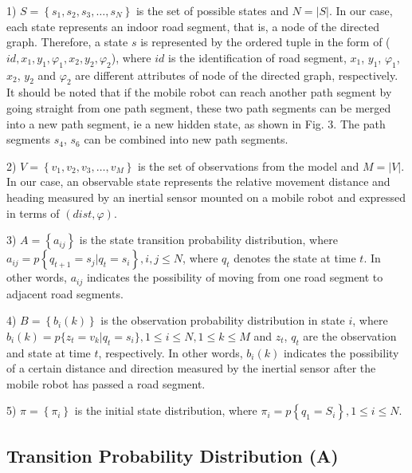 \documentclass{llncs}
\begin{document}
1) $S = \left\{ {{s_1},{s_2},{s_3}, \ldots ,{s_N}} \right\}$ is the set of possible states and $N = \left| S \right|$. In our case, each state represents an indoor road segment, that is, a node of the directed graph. Therefore, a state $s$ is represented by the ordered tuple in the form of ($id,x_{1},y_{1},{\varphi}_{1},x_{2},y_{2},{\varphi}_{2}$), where $id$ is the identification of road segment, $x_{1}$, $y_{1}$, ${\varphi}_{1}$, $x_{2}$, $y_{2}$ and ${\varphi}_{2}$ are different attributes of node of the directed graph, respectively. It should be noted that if the mobile robot can reach another path segment by going straight from one path segment, these two path segments can be merged into a new path segment, ie a new hidden state, as shown in Fig. 3. The path segments $s_4$, $s_6$ can be combined into new path segments.

2) $V = \left\{ {{v_1},{v_2},{v_3}, \ldots ,{v_M}} \right\}$ is the set of observations from the model and $M = \left| V \right|$. In our case, an observable state represents the relative movement distance and heading measured by an inertial sensor mounted on a mobile robot and expressed in terms of $(dist,\varphi)$.

3) $A = \left\{ {{a_{ij}}} \right\}$ is the state transition probability distribution, where \\ ${a_{ij}} = p\left\{ {{q_{t + 1}} = {s_j}|{q_t} = {s_i}} \right\}, i, j \le N$, where ${q_t}$ denotes the state at time $t$. In other words, $a_{ij}$ indicates the possibility of moving from one road segment to adjacent road segments.

4) $B = \left\{ {{b_i}(k)} \right\}$ is the observation probability distribution in state $i$, where ${b_i}(k) = p\{ {z_t} = {v_k}|{q_t} = {s_i}\},1 \le i \le N,1 \le k \le M$ and $z_t$, $q_t$ are the observation and state at time $t$, respectively. In other words, ${b_i}(k)$ indicates the possibility of a certain distance and direction measured by the inertial sensor after the mobile robot has passed a road segment.

5) $\pi  = \left\{ {{\pi _i}} \right\}$ is the initial state distribution, where ${\pi _i} = p\left\{ {{q_1} = {S_i}} \right\},1 \le i \le N$.

\subsection{Transition Probability Distribution (A)}
\end{document}

